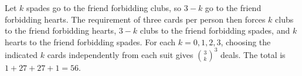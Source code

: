 Let $k$ spades go to the friend forbidding clubs, so $3-k$ go to the friend forbidding hearts. The requirement of three cards per person then forces $k$ clubs to the friend forbidding hearts, $3-k$ clubs to the friend forbidding spades, and $k$ hearts to the friend forbidding spades. For each $k=0,1,2,3$, choosing the indicated $k$ cards independently from each suit gives $\binom3k^3$ deals. The total is $1+27+27+1=\boxed{56}$.
